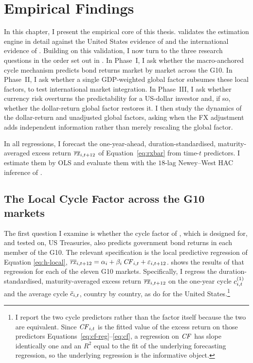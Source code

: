 \chapter{Empirical Findings}
\label{ch:results}

In this chapter, I present the empirical core of this thesis. 
validates the estimation engine in detail against the United States evidence of
\citet{cieslak2015} and the international evidence of \citet{dahlquist2013}. Building on this
validation, I now turn to the three research questions in the order set out in
. In Phase~I, I ask whether the macro-anchored cycle
mechanism predicts bond returns market by market across the G10. In Phase~II, I
ask whether a single GDP-weighted global factor subsumes these local factors,
to test international market integration. In Phase~III, I
ask whether currency risk overturns the predictability for a US-dollar investor
and, if so, whether the dollar-return global factor restores it. I then study the
dynamics of the dollar-return and unadjusted global factors, asking when the FX
adjustment adds independent information rather than merely rescaling the global
factor.

In all regressions, I forecast the one-year-ahead, duration-standardised,
maturity-averaged excess return $\overline{\mathit{rx}}_{i,t+12}$ of Equation~\eqref{eq:rxbar} from
time-$t$ predictors. I estimate them by OLS and evaluate
them with the $18$-lag Newey--West HAC inference of .

\section{The Local Cycle Factor across the G10 markets}
\label{sec:res-phase1}

The first question I examine is whether the cycle factor of \citet{cieslak2015},
which is designed for, and tested on, US Treasuries, also predicts
government bond returns in each member of the G10. The relevant specification is
the local predictive regression of Equation \eqref{eq:h-local}, $\overline{\mathit{rx}}_{i,t+12}=\alpha_i+\beta_i\,\mathit{CF}_{i,t}
+\varepsilon_{i,t+12}$.
 shows the results of that regression for each of the eleven
G10 markets. Specifically, I regress the duration-standardised, maturity-averaged
excess return $\overline{\mathit{rx}}_{i,t+12}$ on the one-year cycle $c^{(1)}_{i,t}$ and the
average cycle $\bar{c}_{i,t}$, country by country, as \citet{cieslak2015} do for
the United States.\footnote{I report the two cycle predictors rather than the
  factor itself because the two are equivalent. Since $\mathit{CF}_{i,t}$ is the fitted
  value of the excess return on those predictors
  Equations~\eqref{eq:cf-reg}--\eqref{eq:cf}, a regression on $\mathit{CF}$ has slope identically
  one and an $R^{2}$ equal to the fit of the underlying forecasting regression,
  so the underlying regression is the informative object.}

